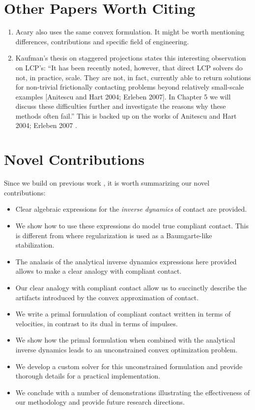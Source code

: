 \section{Other Papers Worth Citing}

\begin{enumerate}
	\item Acary \cite{bib:acary2011formulation} also uses the same convex
	formulation. It might be worth mentioning differences, contributions and
	specific field of engineering.
	\item Kaufman's thesis on staggered projections
	\cite{bib:kaufman2009coupled} states this interesting observation on LCP's:
	``It has been recently noted, however, that direct LCP solvers do not, in
	practice, scale. They are not, in fact, currently able to return solutions
	for non-trivial frictionally contacting problems beyond relatively
	small-scale examples [Anitescu and Hart 2004; Erleben 2007]. In Chapter 5 we
	will discuss these difficulties further and investigate the reasons why
	these methods often fail.'' This is backed up on the works of Anitescu and
	Hart 2004; Erleben 2007 \cite{bib:anitescu2004fixed,bib:erleben2007velocity}.
\end{enumerate}

\section{Novel Contributions}

Since we build on previous work \cite{bib:anitescu2006,
bib:anitescu2010,bib:todorov2014}, it is worth summarizing our novel
contributions:
\begin{itemize}
	\item Clear algebraic expressions for the \textit{inverse dynamics} of
	contact are provided.
	\item We show how to use these expressions do model true compliant contact.
	This is different from \cite{bib:todorov2014} where regularization is used
	as a Baumgarte-like stabilization.
	\item The analasis of the analytical inverse dynamics expressions here
	provided allows to make a clear analogy with compliant contact.
	\item Our clear analogy with compliant contact allow us to succinctly
	describe the artifacts introduced by the convex approximation of contact.
	\item We write a primal formulation of compliant contact written in terms of
	velocities, in contrast to its dual in terms of impulses.
	\item We show how the primal formulation when combined with the analytical
	 inverse dynamics leads to an unconstrained convex optimization problem.
	\item We develop a custom solver for this unconstrained formulation and
	provide thorough details for a practical implementation.
	\item We conclude with a number of demonstrations illustrating the
	effectiveness of our methodology and provide future research directions.
\end{itemize}
